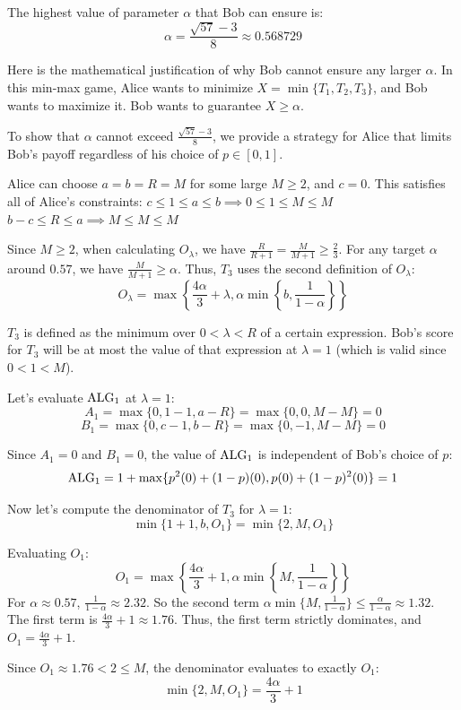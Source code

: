 \documentclass[11pt]{article}
\newcommand{\ALG}{\textnormal{ALG}}
\begin{document}
The highest value of parameter $\alpha$ that Bob can ensure is:
$$\alpha = \frac{\sqrt{57}-3}{8} \approx 0.568729$$

Here is the mathematical justification of why Bob cannot ensure any larger $\alpha$. In this min-max game, Alice wants to minimize $X = \min\{T_1, T_2, T_3\}$, and Bob wants to maximize it. Bob wants to guarantee $X \ge \alpha$.

To show that $\alpha$ cannot exceed $\frac{\sqrt{57}-3}{8}$, we provide a strategy for Alice that limits Bob's payoff regardless of his choice of $p \in [0, 1]$.

Alice can choose $a = b = R = M$ for some large $M \ge 2$, and $c=0$.
This satisfies all of Alice's constraints:
$c \le 1 \le a \le b \implies 0 \le 1 \le M \le M$
$b-c \le R \le a \implies M \le M \le M$

Since $M \ge 2$, when calculating $O_\lambda$, we have $\frac{R}{R+1} = \frac{M}{M+1} \ge \frac{2}{3}$.
For any target $\alpha$ around $0.57$, we have $\frac{M}{M+1} \ge \alpha$. Thus, $T_3$ uses the second definition of $O_\lambda$:
$$O_\lambda = \max\left\{\frac{4\alpha}{3} + \lambda, \alpha \min\left\{b, \frac{1}{1-\alpha} \right\} \right\}$$

$T_3$ is defined as the minimum over $0 < \lambda < R$ of a certain expression. Bob's score for $T_3$ will be at most the value of that expression at $\lambda = 1$ (which is valid since $0 < 1 < M$).

Let's evaluate $\ALG_1$ at $\lambda = 1$:
$$A_1 = \max\{0, 1-1, a-R\} = \max\{0, 0, M-M\} = 0$$
$$B_1 = \max\{0, c-1, b-R\} = \max\{0, -1, M-M\} = 0$$

Since $A_1 = 0$ and $B_1 = 0$, the value of $\ALG_1$ is independent of Bob's choice of $p$:
$$\ALG_1 = 1 + \max\{p^2(0) + (1-p)(0), p(0) + (1-p)^2(0)\} = 1$$

Now let's compute the denominator of $T_3$ for $\lambda = 1$:
$$\min\{1+1, b, O_1\} = \min\{2, M, O_1\}$$

Evaluating $O_1$:
$$O_1 = \max\left\{\frac{4\alpha}{3} + 1, \alpha \min\left\{M, \frac{1}{1-\alpha} \right\} \right\}$$
For $\alpha \approx 0.57$, $\frac{1}{1-\alpha} \approx 2.32$. So the second term $\alpha \min\{M, \frac{1}{1-\alpha}\} \le \frac{\alpha}{1-\alpha} \approx 1.32$.
The first term is $\frac{4\alpha}{3} + 1 \approx 1.76$.
Thus, the first term strictly dominates, and $O_1 = \frac{4\alpha}{3} + 1$.

Since $O_1 \approx 1.76 < 2 \le M$, the denominator evaluates to exactly $O_1$:
$$\min\{2, M, O_1\} = \frac{4\alpha}{3} + 1$$
\end{document}

